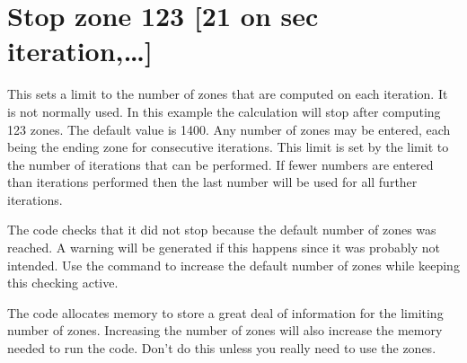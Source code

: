 \section{Stop zone 123 [21 on sec iteration,\dots]}

This sets a limit to the number of zones that are computed on each
iteration.
It is not normally used.
In this example the calculation will
stop after computing 123 zones.
The default value is 1400.
Any number
of zones may be entered, each being the ending zone for consecutive
iterations.
This limit is set by the limit to the number of iterations
that can be performed.
If fewer numbers are entered than iterations
performed then the last number will be used for all further iterations.

The code checks that it did not stop because the default number of zones
was reached.
A warning will be generated if this happens since it was
probably not intended.
Use the  command to increase the default number
of zones while keeping this checking active.

The code allocates memory to store a great deal of information for the
limiting number of zones.
Increasing the number of zones will also increase
the memory needed to run the code.
Don't do this unless you really need
to use the zones.


